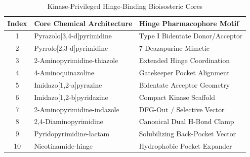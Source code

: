 \documentclass[journal]{IEEEtran}
\begin{document}
\begin{table}[!t]
\caption{Kinase-Privileged Hinge-Binding Bioisosteric Cores}
\label{tab:cores}
\centering
\begin{tabular}{cll}
\toprule
\textbf{Index} & \textbf{Core Chemical Architecture} & \textbf{Hinge Pharmacophore Motif} \\
\midrule
1 & Pyrazolo[3,4-d]pyrimidine & Type I Bidentate Donor/Acceptor \\
2 & Pyrrolo[2,3-d]pyrimidine & 7-Deazapurine Mimetic \\
3 & 2-Aminopyrimidine-thiazole & Extended Hinge Coordination \\
4 & 4-Aminoquinazoline & Gatekeeper Pocket Alignment \\
5 & Imidazo[1,2-a]pyrazine & Bidentate Acceptor Geometry \\
6 & Imidazo[1,2-b]pyridazine & Compact Kinase Scaffold \\
7 & 2-Aminopyrimidine-indazole & DFG-Out / Selective Vector \\
8 & 2,4-Diaminopyrimidine & Canonical Dual H-Bond Clamp \\
9 & Pyridopyrimidine-lactam & Solubilizing Back-Pocket Vector \\
10 & Nicotinamide-hinge & Hydrophobic Pocket Expander \\
\bottomrule
\end{tabular}
\end{table}
\end{document}
